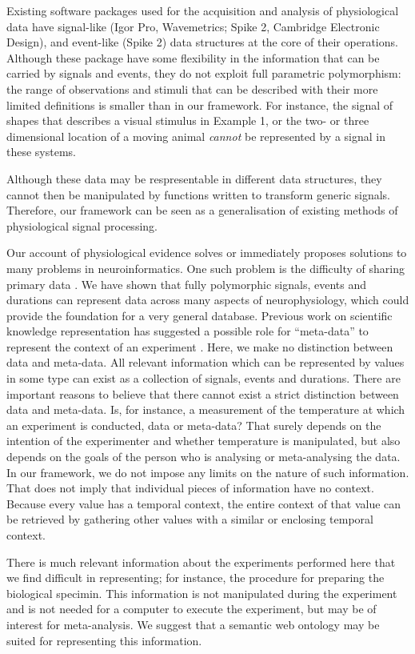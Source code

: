 Existing software packages used for the acquisition and analysis of
physiological data have signal-like (Igor Pro, Wavemetrics; Spike 2,
Cambridge Electronic Design), and event-like (Spike 2) data structures
at the core of their operations. Although these package have some
flexibility in the information that can be carried by signals and
events, they do not exploit full parametric polymorphism: the range of
observations and stimuli that can be described with their more limited
definitions is smaller than in our framework. For instance, the signal
of shapes that describes a visual stimulus in Example 1, or the two-
or three dimensional location of a moving animal \emph{cannot} be
represented by a signal in these systems. 

Although these data may be
respresentable in different data structures, they cannot then be
manipulated by functions written to transform generic
signals. Therefore, our framework can be seen as a generalisation of
existing methods of physiological signal processing.

Our account of physiological evidence solves or immediately proposes
solutions to many problems in neuroinformatics. One such problem is
the difficulty of sharing primary data \citep{Amari2002}. We have
shown that fully polymorphic signals, events and durations can
represent data across many aspects of neurophysiology, which could
provide the foundation for a very general database. Previous work on
scientific knowledge representation has suggested a possible role for
``meta-data'' to represent the context of an experiment
\citep{Bower2009}. Here, we make no distinction between data and
meta-data. All relevant information which can be represented by values
in some type can exist as a collection of signals, events and
durations. There are important reasons to believe that there cannot
exist a strict distinction between data and meta-data. Is, for
instance, a measurement of the temperature at which an experiment is
conducted, data or meta-data?  That surely depends on the intention of
the experimenter and whether temperature is manipulated, but also
depends on the goals of the person who is analysing or meta-analysing
the data. In our framework, we do not impose any limits on the nature
of such information. That does not imply that individual pieces of
information have no context. Because every value has a temporal
context, the entire context of that value can be retrieved by
gathering other values with a similar or enclosing temporal context.

There is much relevant information about the experiments performed
here that we find difficult in representing; for instance, the
procedure for preparing the biological specimin. This information is
not manipulated during the experiment and is not needed for a computer
to execute the experiment, but may be of interest for
meta-analysis. We suggest that a semantic web ontology may be suited
for representing this information.

